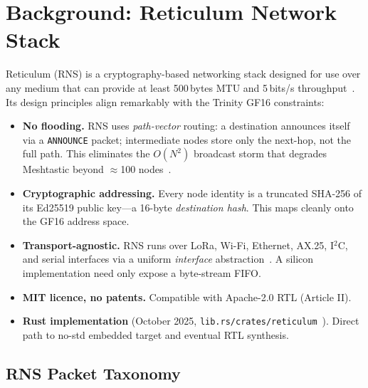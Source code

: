 \section{Background: Reticulum Network Stack}

Reticulum (RNS) is a cryptography-based networking stack designed for
use over any medium that can provide at least 500\,bytes MTU and
5\,bits/s throughput~\cite{rns2018markqvist}.
Its design principles align remarkably with the Trinity GF16 constraints:

\begin{itemize}
  \item \textbf{No flooding.} RNS uses \emph{path-vector} routing:
        a destination announces itself via a \texttt{ANNOUNCE} packet;
        intermediate nodes store only the next-hop, not the full path.
        This eliminates the $O(N^2)$ broadcast storm that degrades
        Meshtastic beyond $\approx$100 nodes~\cite{meshtastic2024analysis}.
  \item \textbf{Cryptographic addressing.} Every node identity is a
        truncated SHA-256 of its Ed25519 public key—a 16-byte
        \emph{destination hash}.  This maps cleanly onto the GF16
        address space.
  \item \textbf{Transport-agnostic.} RNS runs over LoRa, Wi-Fi,
        Ethernet, AX.25, I$^2$C, and serial interfaces via a uniform
        \emph{interface} abstraction~\cite{rns2018markqvist}.
        A silicon implementation need only expose a byte-stream FIFO.
  \item \textbf{MIT licence, no patents.} Compatible with Apache-2.0
        RTL (Article II).
  \item \textbf{Rust implementation} (October 2025,
        \texttt{lib.rs/crates/reticulum}~\cite{rns_rust2025}).
        Direct path to no-std embedded target and eventual RTL synthesis.
\end{itemize}

\subsection{RNS Packet Taxonomy}

\begin{table}[h]
\centering
\caption{Reticulum packet types and MRU state implications}
\label{tab:rns-packets}
\end{table}

